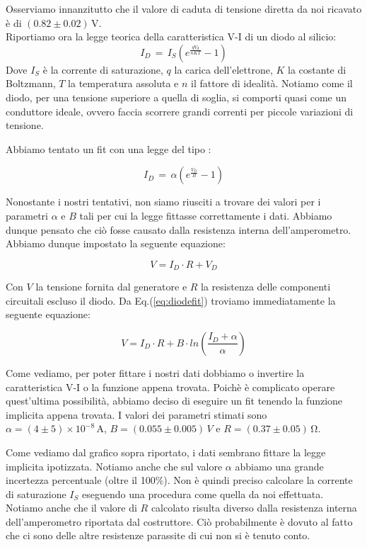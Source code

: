 \phantom{x}

Osserviamo innanzitutto che il valore di caduta di tensione diretta da noi ricavato è di $(0.82 \pm 0.02)\,\si{\volt}$.\\
Riportiamo ora la legge teorica della caratteristica V-I di un diodo al silicio:
\begin{equation}
I_{D} \, = \, I_{S} \left( e^{\frac{q V_d}{nKT}} -1 \right)
\label{eq:diode}
\end{equation}
Dove $I_S$ è la corrente di saturazione, $q$ la carica dell'elettrone, $K$ la costante di Boltzmann, $T$ la temperatura assoluta e $n$ il fattore di idealità. 
Notiamo come il diodo, per una tensione superiore a quella di soglia, si comporti quasi come un conduttore ideale, ovvero faccia scorrere grandi correnti per piccole variazioni di tensione. 

Abbiamo tentato un fit con una legge del tipo : 

\begin{equation}
I_{D} \, = \, \alpha \left( e^{\frac{V_{D}}{B}} -1 \right)
\label{eq:diodefit}
\end{equation}

Nonostante i nostri tentativi, non siamo riusciti a trovare dei valori per i parametri $\alpha$ e $B$ tali per cui la legge fittasse correttamente i dati. Abbiamo dunque pensato che ciò fosse causato dalla resistenza interna dell'amperometro. Abbiamo dunque impostato la seguente equazione:

$$V=I_D \cdot R + V_D$$

Con $V$ la tensione fornita dal generatore e $R$ la resistenza delle componenti circuitali escluso il diodo. Da Eq.(\ref{eq:diodefit}) troviamo immediatamente la seguente equazione:

\begin{equation}
V=I_D \cdot R + B \cdot ln (\frac{I_D+\alpha}{\alpha})
\label{eq:diodefit2}
\end{equation}

Come vediamo, per poter fittare i nostri dati dobbiamo o invertire la caratteristica V-I o la funzione appena trovata. Poichè è complicato operare quest'ultima possibilità, abbiamo deciso di eseguire un fit tenendo la funzione implicita appena trovata. I valori dei parametri stimati sono $\alpha=(4\pm 5)\times 10^{-8} \,\si{\ampere}$, $B=(0.055\pm 0.005)\,V $ e $R=(0.37\pm 0.05)\,\si{\ohm}$.

Come vediamo dal grafico sopra riportato, i dati sembrano fittare la legge implicita ipotizzata. Notiamo anche che sul valore $\alpha$ abbiamo una grande incertezza percentuale (oltre il 100\%). Non è quindi preciso calcolare la corrente di saturazione $I_S$ eseguendo una procedura come quella da noi effettuata. Notiamo anche che il valore di $R$ calcolato risulta diverso dalla resistenza interna dell'amperometro riportata dal costruttore. Ciò probabilmente è dovuto al fatto che ci sono delle altre resistenze parassite di cui non si è tenuto conto. 
 
